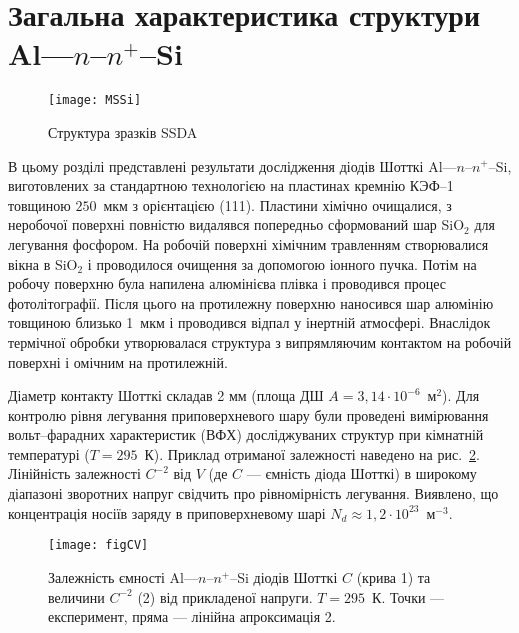 \section{Загальна характеристика структури Al---$n$--$n^+$--Si\label{MSSi}}

\begin{figure}[b]
\center
\texttt{[image: MSSi]}%
\caption{\label{figMSSi}
Структура зразків SSDA}
\end{figure}



В цьому розділі представлені результати дослідження діодів Шотткі Al---$n$--$n^+$--Si,
виготовлених за стандартною технологією \cite{Vorobets:FM2003,StrihaBook1987} на пластинах кремнію КЭФ--1 товщиною $250$~мкм
з орієнтацією (111).
Пластини хімічно очищалися, з неробочої поверхні
повністю видалявся попередньо сформований шар SiO$_2$ для легування фосфором.
На робочій поверхні хімічним травленням створювалися вікна в SiO$_2$ і проводилося очищення
за допомогою іонного пучка.
Потім на робочу поверхню була напилена алюмінієва плівка і проводився процес фотолітографії.
Після цього на протилежну поверхню наносився шар алюмінію товщиною близько 1~мкм і проводився відпал
у інертній атмосфері.
Внаслідок термічної обробки утворювалася структура з випрямляючим контактом на робочій поверхні і омічним на протилежній.

Діаметр контакту Шотткі складав 2 мм (площа ДШ $A=3,14\cdot10^{-6}$~м$^2$).
Для контролю рівня легування приповерхневого шару були проведені
вимірювання вольт--фарадних характеристик (ВФХ) досліджуваних структур при кімнатній температурі ($T = 295$~К).
Приклад отриманої залежності наведено на рис.~\ref{figCV}.
Лінійність залежності $C^{-2}$ від $V$
(де $C$ --- ємність діода Шотткі)
в широкому діапазоні зворотних напруг свідчить про рівномірність легування.
Виявлено, що концентрація носіїв заряду в приповерхневому шарі $N_d\approx1,2\cdot10^{23}$~м$^{-3}$.


\begin{figure}
\center
\texttt{[image: figCV]}
\caption{\label{figCV}
Залежність ємності Al---$n$--$n^+$--Si діодів Шотткі $C$ (крива 1) та величини $C^{-2}$ (2) від прикладеної напруги.
$T=295$~К.
Точки --- експеримент, пряма --- лінійна апроксимація 2.
}%
\end{figure}







